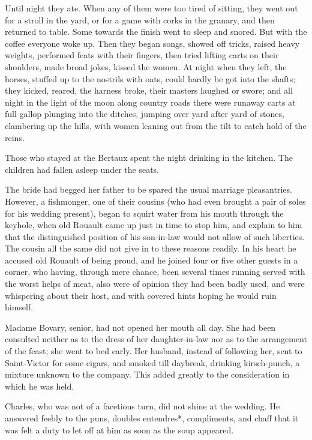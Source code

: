 \documentclass[11pt,twocolumn]{ltugboat}
\begin{document}
Until night they ate. When any of them were too tired of sitting, they
went out for a stroll in the yard, or for a game with corks in the
granary, and then returned to table. Some towards the finish went to
sleep and snored. But with the coffee everyone woke up. Then they began
songs, showed off tricks, raised heavy weights, performed feats with
their fingers, then tried lifting carts on their shoulders, made broad
jokes, kissed the women. At night when they left, the horses, stuffed
up to the nostrils with oats, could hardly be got into the shafts; they
kicked, reared, the harness broke, their masters laughed or swore;
and all night in the light of the moon along country roads there were
runaway carts at full gallop plunging into the ditches, jumping over
yard after yard of stones, clambering up the hills, with women leaning
out from the tilt to catch hold of the reins.

Those who stayed at the Bertaux spent the night drinking in the kitchen.
The children had fallen asleep under the seats.

The bride had begged her father to be spared the usual marriage
pleasantries. However, a fishmonger, one of their cousins (who had even
brought a pair of soles for his wedding present), began to squirt water
from his mouth through the keyhole, when old Rouault came up just in
time to stop him, and explain to him that the distinguished position
of his son-in-law would not allow of such liberties. The cousin all the
same did not give in to these reasons readily. In his heart he accused
old Rouault of being proud, and he joined four or five other guests in
a corner, who having, through mere chance, been several times running
served with the worst helps of meat, also were of opinion they had been
badly used, and were whispering about their host, and with covered hints
hoping he would ruin himself.

Madame Bovary, senior, had not opened her mouth all day. She had been
consulted neither as to the dress of her daughter-in-law nor as to the
arrangement of the feast; she went to bed early. Her husband, instead
of following her, sent to Saint-Victor for some cigars, and smoked till
daybreak, drinking kirsch-punch, a mixture unknown to the company. This
added greatly to the consideration in which he was held.

Charles, who was not of a facetious turn, did not shine at the wedding.
He answered feebly to the puns, doubles entendres*, compliments, and
chaff that it was felt a duty to let off at him as soon as the soup
appeared.
\end{document}
